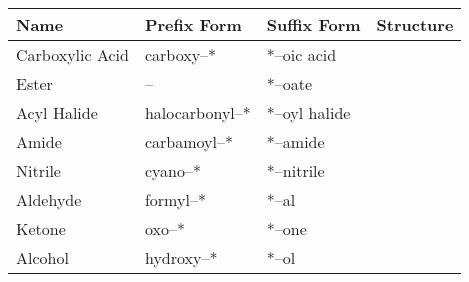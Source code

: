 		\begin{center}\renewcommand{\arraystretch}{1.4}
		\begin{longtabu} to \textwidth {| X[c,m] | X[c,m] | X[c,m] | X[c,m] |}

			\hline

		Name			&	Prefix Form		&	Suffix Form		&	Structure \\
		\hline
		Carboxylic Acid	&	carboxy–*		&	*–oic acid		&
			\vspace{2mm}
			\vspace{2mm}	\\


		\hline
		Ester			&		–			&	*–oate			&
			\vspace{2mm}
			\vspace{2mm}	\\


		\hline
		Acyl Halide		&	halocarbonyl–*	&	*–oyl halide	&
			\vspace{2mm}
			\vspace{2mm}	\\


		\hline
		Amide			&	carbamoyl–*		&	*–amide			&
			\vspace{2mm}
			\vspace{2mm}	\\


		\hline
		Nitrile			&	cyano–*			&	*–nitrile		&
			\vspace{10mm}	%
			\vspace{10mm}	\\


		\hline
		Aldehyde		&	formyl–*		&	*–al			&
			\vspace{2mm}
			\vspace{2mm}	\\


		\hline
		Ketone			&	oxo–*			&	*–one			&
			\vspace{2mm}
			\vspace{2mm}	\\


		\hline
		Alcohol			&	hydroxy–*		&	*–ol			&
			\vspace{2mm}
			\vspace{2mm}	\\



\end{longtabu}
\end{center}
